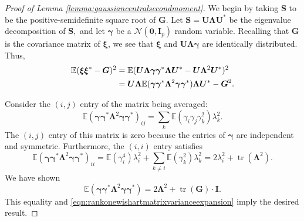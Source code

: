 \documentclass[11pt,letterpaper,twoside,reqno,nosumlimits]{amsart}
\renewcommand{\star}{*}
\newcommand{\mat}[1]{\ensuremath{\bm{#1}}} %
\renewcommand{\vec}[1]{\ensuremath{\bm{#1}}}
\newcommand{\E}{\ensuremath{\mathbb{E}}}
\DeclareMathOperator{\tr}{tr}
\theoremstyle{remark}
\numberwithin{equation}{section}
\numberwithin{thm}{section}
\numberwithin{prop}{section}
\numberwithin{defn}{section}
\numberwithin{remark}{section}
\begin{document}
\begin{proof}[Proof of Lemma \ref{lemma:gaussiancentralsecondmoment}]
We begin by taking $\mat{S}$ to be the positive-semidefinite square root of $\mat{G}.$ Let $\mat{S} = \mat{U} \mat{\Lambda} \mat{U}^\star$ be the eigenvalue decomposition of $\mat{S},$ and let $\vec{\gamma}$ be a $\mathcal{N}(\vec{0}, \mathbf{I}_p)$ random variable. Recalling that $\mat{G}$ is the covariance matrix of $\mat{\xi}$, we see that $\vec{\xi}$ and $\mat{U} \mat{\Lambda} \vec{\gamma}$ are identically distributed. Thus,
\begin{align}
\E(\vec{\xi}\vec{\xi}^\star - \mat{G})^2 
& = \E(\mat{U} \mat{\Lambda} \vec{\gamma}\vec{\gamma}^\star \mat{\Lambda} \mat{U}^\star - \mat{U} \mat{\Lambda}^2 \mat{U}^\star)^2 \notag \\
& = \mat{U} \mat{\Lambda} \E(\vec{\gamma}\vec{\gamma}^\star \mat{\Lambda}^2 \vec{\gamma}\vec{\gamma}^\star) \mat{\Lambda} \mat{U}^\star - \mat{G}^2. 
\label{eqn:rankonewishartmatrixvarianceexpansion}
\end{align}

Consider the $(i,j)$ entry of the matrix being averaged:
\[
\E(\vec{\gamma}\vec{\gamma}^\star \mat{\Lambda}^2 \vec{\gamma}\vec{\gamma}^\star)_{ij} =  \sum_k \E(\gamma_i \gamma_j \gamma_k^2) \lambda_k^2.
\]
The $(i,j)$ entry of this matrix is zero because the entries of $\vec{\gamma}$ are independent and symmetric. Furthermore, the $(i,i)$ entry satisfies
\[
\E(\vec{\gamma}\vec{\gamma}^\star \mat{\Lambda}^2 \vec{\gamma}\vec{\gamma}^\star)_{ii} = \E(\gamma_i^4) \lambda_i^2 + \sum_{k \neq i} \E(\gamma_k^2) \lambda_k^2 = 2 \lambda_i^2 + \tr(\mat{\Lambda}^2).
\]
We have shown
\[
\E(\vec{\gamma} \vec{\gamma}^\star \mat{\Lambda}^2 \vec{\gamma}\vec{\gamma}^\star) = 2 \mat{\Lambda}^2 + \tr(\mat{G}) \cdot \mathbf{I}.
\]
This equality and \eqref{eqn:rankonewishartmatrixvarianceexpansion} imply the desired result.
\end{proof}
\end{document}
